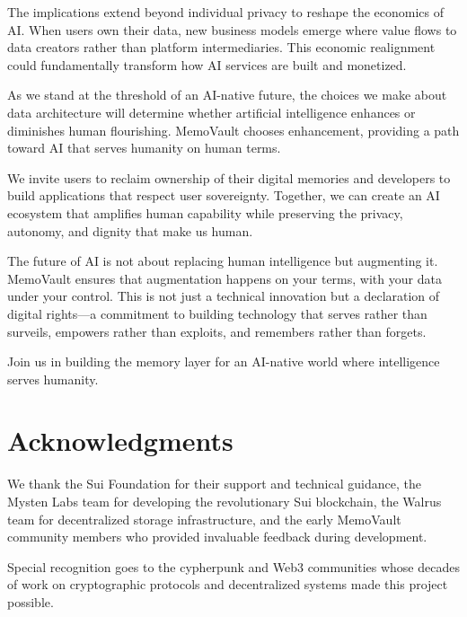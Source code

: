 \documentclass[12pt, a4paper]{article}
\begin{document}
The implications extend beyond individual privacy to reshape the economics of AI. When users own their data, new business models emerge where value flows to data creators rather than platform intermediaries. This economic realignment could fundamentally transform how AI services are built and monetized.

As we stand at the threshold of an AI-native future, the choices we make about data architecture will determine whether artificial intelligence enhances or diminishes human flourishing. MemoVault chooses enhancement, providing a path toward AI that serves humanity on human terms.


We invite users to reclaim ownership of their digital memories and developers to build applications that respect user sovereignty. Together, we can create an AI ecosystem that amplifies human capability while preserving the privacy, autonomy, and dignity that make us human.

The future of AI is not about replacing human intelligence but augmenting it. MemoVault ensures that augmentation happens on your terms, with your data under your control. This is not just a technical innovation but a declaration of digital rights—a commitment to building technology that serves rather than surveils, empowers rather than exploits, and remembers rather than forgets.

Join us in building the memory layer for an AI-native world where intelligence serves humanity.

\section{Acknowledgments}

We thank the Sui Foundation for their support and technical guidance, the Mysten Labs team for developing the revolutionary Sui blockchain, the Walrus team for decentralized storage infrastructure, and the early MemoVault community members who provided invaluable feedback during development.

Special recognition goes to the cypherpunk and Web3 communities whose decades of work on cryptographic protocols and decentralized systems made this project possible.
\end{document}
